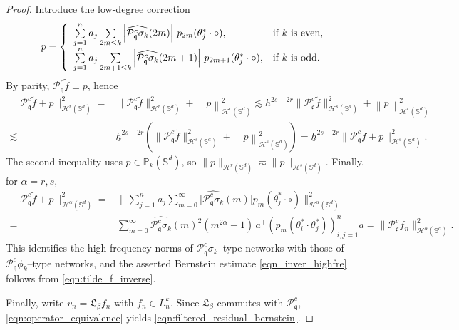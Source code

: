 \documentclass{article}
\numberwithin{equation}{section}
\def\SS{\mathbb{S}}
\def\sul{\sum\limits}
\def\rr{ r}
\def\pc{\mathcal{P}^c}
\def\mq{\mathfrak{q}}
\def\mH{\mathcal{H}^\rr(\SS^d)}
\begin{document}
\begin{proof}
Introduce the low-degree correction
\begin{equation}
    p=\left\{\begin{array}{ll}
        \sul_{j=1}^n a_j \sul_{2m\leq k}\left|\widehat{\pc_\mq\sigma_k}(2m)\right|\,p_{2m}(\theta_j^*\cdot\circ), &\hbox{if $k$ is even},  \\
        \sul_{j=1}^n a_j \sul_{2m+1\leq k}\left|\widehat{\pc_\mq\sigma_k}(2m+1)\right|\,p_{2m+1}(\theta_j^*\cdot\circ), &\hbox{if $k$ is odd}.
    \end{array}\right.
\end{equation}
By parity, $\pc_\mq\tilde f\perp p$, hence
\begin{equation*}
    \begin{split}
        \big\|\pc_\mq\tilde f+p\big\|_{\mH}^2
        =&\big\|\pc_\mq\tilde f\big\|_{\mH}^2+\left\|p\right\|_{\mH}^2
        \lesssim \underline{h}^{2s-2r}\|\pc_\mq\tilde f\|_{\mathcal{H}^s(\SS^d)}^2+\left\|p\right\|_{\mH}^2\\
        \lesssim&\underline{h}^{2s-2r}\left(\|\pc_\mq\tilde f\|_{\mathcal{H}^s(\SS^d)}^2+\left\|p\right\|_{\mathcal{H}^s(\SS^d)}^2\right)
        =\underline{h}^{2s-2r}\big\|\pc_\mq\tilde f+p\big\|_{\mathcal{H}^s(\SS^d)}^2.
    \end{split}
\end{equation*}
The second inequality uses $p\in\mathbb P_k(\SS^d)$, so $\|p\|_{\mH}\eqsim\|p\|_{\mathcal H^s(\SS^d)}$.
Finally, for $\alpha=r,s$,
\begin{equation*}
    \begin{split}
        \big\|\pc_\mq\tilde f+p\big\|_{\mathcal{H}^\alpha(\SS^d)}^2
        =&\Big\|\sul_{j=1}^na_j\sul_{m=0}^\infty\big|\widehat{\pc_\mq\sigma_k}(m)\big|p_m(\theta_j^*\cdot\circ)\Big\|_{\mathcal{H}^\alpha(\SS^d)}^2\\
        =&\sul_{m=0}^\infty\widehat{\pc_\mq\sigma_k}(m)^2(m^{2\alpha}+1)\,
        a^\top\left(p_m(\theta_i^*\cdot \theta_j^*)\right)_{i,j=1}^na
        =\|\pc_\mq f_n\|_{\mathcal{H}^\alpha(\SS^d)}^2.
    \end{split}
\end{equation*}
This identifies the high-frequency norms of $\pc_\mq\sigma_k$–type networks with those of $\pc_\mq\phi_k$–type networks, and the asserted Bernstein estimate \eqref{eqn_inver_highfre} follows from \eqref{eqn:tilde_f_inverse}.

Finally, write $v_n=\mathfrak L_\beta f_n$ with $f_n\in L_n^k$. Since $\mathfrak L_\beta$ commutes with $\mathcal P_{\mathfrak q}^c$, \eqref{eqn:operator_equivalence} yields \eqref{eqn:filtered_residual_bernstein}.

\end{proof}
\end{document}
